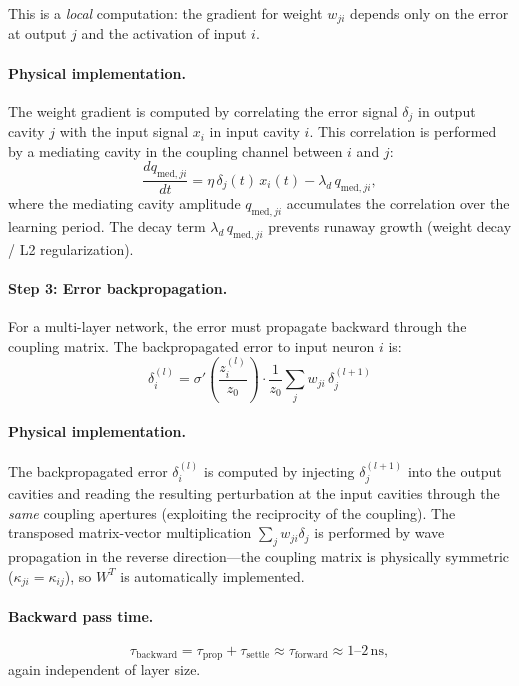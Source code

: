 \documentclass[11pt,twocolumn]{article}
\theoremstyle{definition}
\theoremstyle{remark}
\begin{document}
This is a \emph{local} computation: the gradient for weight $w_{ji}$
depends only on the error at output $j$ and the activation of input $i$.

\paragraph{Physical implementation.}
The weight gradient is computed by correlating the error signal $\delta_j$
in output cavity $j$ with the input signal $x_i$ in input cavity $i$.
This correlation is performed by a mediating cavity in the coupling
channel between $i$ and $j$:
\begin{equation}
\frac{d q_{\mathrm{med},ji}}{dt} = \eta\,\delta_j(t)\,x_i(t) - \lambda_d\,q_{\mathrm{med},ji},
\end{equation}
where the mediating cavity amplitude $q_{\mathrm{med},ji}$ accumulates
the correlation over the learning period. The decay term
$\lambda_d\,q_{\mathrm{med},ji}$ prevents runaway growth (weight
decay / L2 regularization).

\paragraph{Step 3: Error backpropagation.}
For a multi-layer network, the error must propagate backward through the
coupling matrix. The backpropagated error to input neuron $i$ is:
\begin{equation}
\boxed{
\delta_i^{(l)} = \sigma'\!\left(\frac{z_i^{(l)}}{z_0}\right)\cdot\frac{1}{z_0}
\sum_j w_{ji}\,\delta_j^{(l+1)}
}
\label{eq:backprop}
\end{equation}

\paragraph{Physical implementation.}
The backpropagated error $\delta_i^{(l)}$ is computed by injecting
$\delta_j^{(l+1)}$ into the output cavities and reading the resulting
perturbation at the input cavities through the \emph{same} coupling
apertures (exploiting the reciprocity of the coupling). The transposed
matrix-vector multiplication $\sum_j w_{ji}\delta_j$ is performed by
wave propagation in the reverse direction---the coupling matrix is
physically symmetric ($\kappa_{ji} = \kappa_{ij}$), so $W^T$ is
automatically implemented.

\paragraph{Backward pass time.}
\begin{equation}
\tau_{\mathrm{backward}} = \tau_{\mathrm{prop}} + \tau_{\mathrm{settle}}
\approx \tau_{\mathrm{forward}} \approx 1\text{--}2\,\mathrm{ns},
\end{equation}
again independent of layer size.
\end{document}

